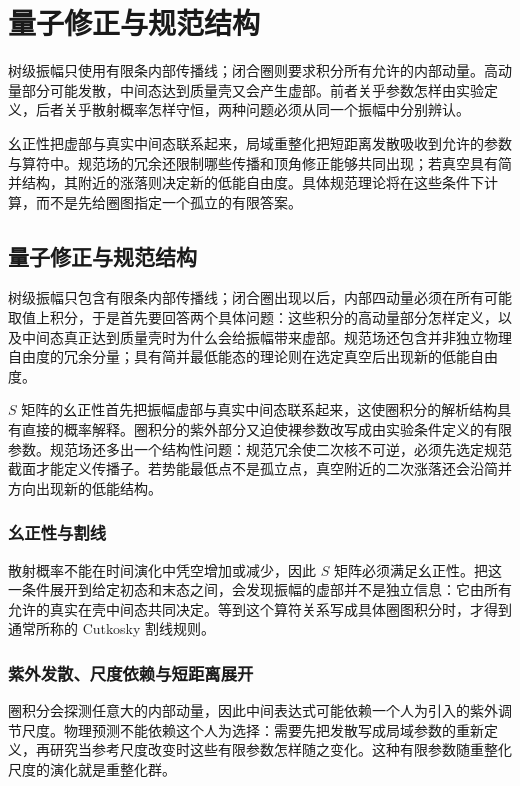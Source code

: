 \chapter{量子修正与规范结构}\label{chap:quantum-radiative-structure}

树级振幅只使用有限条内部传播线；闭合圈则要求积分所有允许的内部动量。高动量部分可能发散，中间态达到质量壳又会产生虚部。前者关乎参数怎样由实验定义，后者关乎散射概率怎样守恒，两种问题必须从同一个振幅中分别辨认。

幺正性把虚部与真实中间态联系起来，局域重整化把短距离发散吸收到允许的参数与算符中。规范场的冗余还限制哪些传播和顶角修正能够共同出现；若真空具有简并结构，其附近的涨落则决定新的低能自由度。具体规范理论将在这些条件下计算，而不是先给圈图指定一个孤立的有限答案。

\section{量子修正与规范结构}

树级振幅只包含有限条内部传播线；闭合圈出现以后，内部四动量必须在所有可能取值上积分，于是首先要回答两个具体问题：这些积分的高动量部分怎样定义，以及中间态真正达到质量壳时为什么会给振幅带来虚部。规范场还包含并非独立物理自由度的冗余分量；具有简并最低能态的理论则在选定真空后出现新的低能自由度。

$S$ 矩阵的幺正性首先把振幅虚部与真实中间态联系起来，这使圈积分的解析结构具有直接的概率解释。圈积分的紫外部分又迫使裸参数改写成由实验条件定义的有限参数。规范场还多出一个结构性问题：规范冗余使二次核不可逆，必须先选定规范截面才能定义传播子。若势能最低点不是孤立点，真空附近的二次涨落还会沿简并方向出现新的低能结构。

\subsection{幺正性与割线}
散射概率不能在时间演化中凭空增加或减少，因此 $S$ 矩阵必须满足幺正性。把这一条件展开到给定初态和末态之间，会发现振幅的虚部并不是独立信息：它由所有允许的真实在壳中间态共同决定。等到这个算符关系写成具体圈图积分时，才得到通常所称的 Cutkosky 割线规则。



\subsection{紫外发散、尺度依赖与短距离展开}
圈积分会探测任意大的内部动量，因此中间表达式可能依赖一个人为引入的紫外调节尺度。物理预测不能依赖这个人为选择：需要先把发散写成局域参数的重新定义，再研究当参考尺度改变时这些有限参数怎样随之变化。这种有限参数随重整化尺度的演化就是重整化群。

